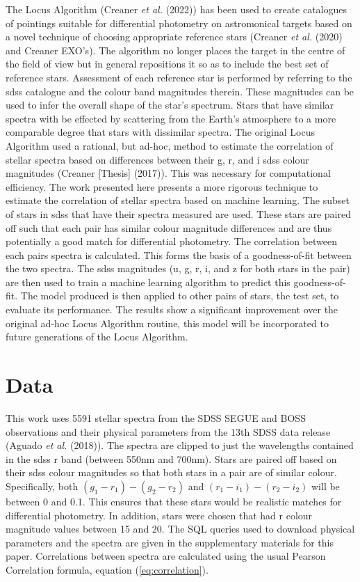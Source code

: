\documentclass[a4paper,fleqn,usenatbib]{mnras}
\begin{document}
The Locus Algorithm (Creaner \emph{et al.} (2022)) has been used to
create catalogues of pointings suitable for differential photometry on
astromonical targets based on a novel technique of choosing appropriate
reference stars (Creaner \emph{et al.} (2020) and Creaner EXO's). The
algorithm no longer places the target in the centre of the field of view
but in general repositions it so as to include the best set of reference
stars. Assessment of each reference star is performed by referring to
the sdss catalogue and the colour band magnitudes therein. These
magnitudes can be used to infer the overall shape of the star's
spectrum. Stars that have similar spectra with be effected by scattering
from the Earth's atmosphere to a more comparable degree that stars with
dissimilar spectra. The original Locus Algorithm used a rational, but
ad-hoc, method to estimate the correlation of stellar spectra based on
differences between their g, r, and i sdss colour magnitudes (Creaner
{[}Thesis{]} (2017)). This was necessary for computational efficiency.
The work presented here presents a more rigorous technique to estimate
the correlation of stellar spectra based on machine learning. The subset
of stars in sdss that have their spectra measured are used. These stars
are paired off such that each pair has similar colour magnitude
differences and are thus potentially a good match for differential
photometry. The correlation between each pairs spectra is calculated.
This forms the basis of a goodness-of-fit between the two spectra. The
sdss magnitudes (u, g, r, i, and z for both stars in the pair) are then
used to train a machine learning algorithm to predict this
goodness-of-fit. The model produced is then applied to other pairs of
stars, the test set, to evaluate its performance. The results show a
significant improvement over the original ad-hoc Locus Algorithm
routine, this model will be incorporated to future generations of the
Locus Algorithm.

\hypertarget{data}{%
\section{Data}\label{data}}

This work uses 5591 stellar spectra from the SDSS SEGUE and BOSS
observations and their physical parameters from the 13th SDSS data
release (Aguado \emph{et al.} (2018)). The spectra are clipped to just
the wavelengths contained in the sdss r band (between 550nm and 700nm).
Stars are paired off based on their sdss colour magnitudes so that both
stars in a pair are of similar colour. Specifically, both
\((g_1-r_1)-(g_2-r_2)\) and \((r_1-i_1)-(r_2-i_2)\) will be between 0
and 0.1. This ensures that these stars would be realistic matches for
differential photometry. In addition, stars were chosen that had r
colour magnitude values between 15 and 20. The SQL queries used to
download physical parameters and the spectra are given in the
supplementary materials for this paper. Correlations between spectra are
calculated using the usual Pearson Correlation formula, equation
(\ref{eq:correlation}).
\end{document}
